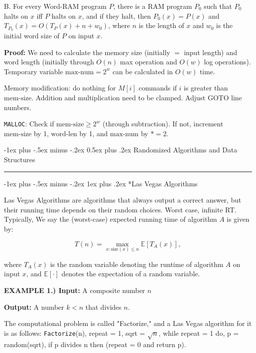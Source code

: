 \documentclass[10pt,landscape]{article}
\makeatletter
\renewcommand{\section}{\@startsection{section}{1}{0mm}%
                                {-1ex plus -.5ex minus -.2ex}%
                                {0.5ex plus .2ex}%
                                {\normalfont\large\bfseries}}
\renewcommand{\subsubsection}{\@startsection{subsubsection}{3}{0mm}%
                                {-1ex plus -.5ex minus -.2ex}%
                                {1ex plus .2ex}%
                                {\normalfont\small\bfseries}}
\makeatother
\begin{document}
\begin{multicols*}{3}
B.  For every Word-RAM program $P$, there is a RAM program $P_0$ such that $P_0$ halts on $x$ iff $P$ halts on $x$, and if they halt, then $P_0(x) = P(x)$ and $T_{P_0}(x) = O(T_P(x) + n + w_0)$, where $n$ is the length of $x$ and $w_0$ is the initial word size of $P$ on input $x$.

\textbf{Proof:}
We need to calculate the memory size (initially \( = \) input length) and word length (initially through \( O(n) \) max operation and \( O(w) \) log operations). Temporary variable \( \text{max-num} = 2^w \) can be calculated in \( O(w) \) time.

Memory modification: do nothing for \( M[i] \) commands if \( i \) is greater than \( \text{mem-size} \). Addition and multiplication need to be clamped. Adjust \( \text{GOTO} \) line numbers.

\texttt{MALLOC}: Check if \( \text{mem-size} \geq 2^w \) (through subtraction). If not, increment \( \text{mem-size} \) by 1, \( \text{word-len} \) by 1, and \( \text{max-num} \) by \( *= 2 \).


\section{Randomized Algorithms and Data Structures}\smallskip \hrule height 2pt \smallskip

\subsubsection*{Las Vegas Algorithms}

Las Vegas Algorithms are algorithms that always output a correct answer, but their running time depends on their random choices. Worst case, infinite RT. Typically, We say the (worst-case) expected running time of algorithm $A$ is given by:

\[
T(n) = \max_{x: \text{size}(x) \leq n} \mathbb{E}[T_A(x)],
\]

where $T_A(x)$ is the random variable denoting the runtime of algorithm $A$ on input $x$, and $\mathbb{E}[\cdot]$ denotes the expectation of a random variable.

\textbf{EXAMPLE 1.) Input:} A composite number $n$

\textbf{Output:} A number $k < n$ that divides $n$.

The computational problem is called "Factorize," and a Las Vegas algorithm for it is as follows:
\texttt{Factorize}(n), repeat = 1, sqrt = $\sqrt{n}$, while repeat = 1 do, p = random(sqrt), if p divides n then (repeat = 0 and return p).


\end{multicols*}
\end{document}
